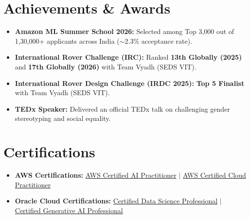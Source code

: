 \documentclass[letterpaper,10pt]{article}
\begin{document}
\section{Achievements \& Awards}
  \begin{itemize}[leftmargin=0.12in, label={}, itemsep=0.5pt, parsep=0pt, topsep=0.5pt]
    \item \small{\textbf{Amazon ML Summer School 2026:} Selected among Top 3,000 out of 1,30,000+ applicants across India ($\sim$2.3\% acceptance rate).}
    \item \small{\textbf{International Rover Challenge (IRC):} Ranked \textbf{13th Globally (2025)} and \textbf{17th Globally (2026)} with Team Vyadh (SEDS VIT).}
    \item \small{\textbf{International Rover Design Challenge (IRDC 2025):} \textbf{Top 5 Finalist} with Team Vyadh (SEDS VIT).}
    \item \small{\textbf{TEDx Speaker:} Delivered an official TEDx talk on challenging gender stereotyping and social equality.}
  \end{itemize}

\section{Certifications}
  \begin{itemize}[leftmargin=0.12in, label={}, itemsep=0.5pt, parsep=0pt, topsep=0.5pt]
    \item \small{\textbf{AWS Certifications:} \href{https://cp.certmetrics.com/amazon/en/public/verify/credential/c4c58cf840b94cecade967170c4e6eb1}{AWS Certified AI Practitioner} $|$ \href{https://cp.certmetrics.com/amazon/en/public/verify/credential/bc3e81176da04bd6ab3dcff612193814}{AWS Certified Cloud Practitioner}}
    \item \small{\textbf{Oracle Cloud Certifications:} \href{https://catalog-education.oracle.com/pls/certview/sharebadge?id=C3199CDA4E4B76D94AEAE70CFCA292011795FEFB3BCD93A18A1454E57C60B0AA}{Certified Data Science Professional} $|$ \href{https://catalog-education.oracle.com/pls/certview/sharebadge?id=EF9A070356E9FB420B39ED42ACCD6CC9326E5653AE07F025C334A2F0238D4652}{Certified Generative AI Professional}}
  \end{itemize}

\end{document}
